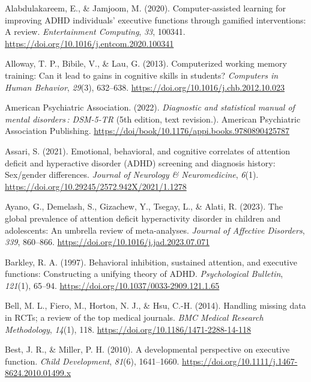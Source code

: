 \documentclass[
  letterpaper,
]{ut-thesis}
\newlength{\cslhangindent}
\newenvironment{CSLReferences}[2] %
 {\begin{list}{}{%
  \setlength{\itemindent}{0pt}
  \setlength{\leftmargin}{0pt}
  \setlength{\parsep}{0pt}
  \ifodd #1
   \setlength{\leftmargin}{\cslhangindent}
   \setlength{\itemindent}{-1\cslhangindent}
  \fi
  \setlength{\itemsep}{#2\baselineskip}}}
 {\end{list}}
\begin{document}
\label{refs}
\begin{CSLReferences}{1}{0}
Alabdulakareem, E., \& Jamjoom, M. (2020). Computer-assisted learning
for improving {ADHD} individuals' executive functions through gamified
interventions: {A} review. \emph{Entertainment Computing}, \emph{33},
100341. \url{https://doi.org/10.1016/j.entcom.2020.100341}

Alloway, T. P., Bibile, V., \& Lau, G. (2013). Computerized working
memory training: {Can} it lead to gains in cognitive skills in students?
\emph{Computers in Human Behavior}, \emph{29}(3), 632--638.
\url{https://doi.org/10.1016/j.chb.2012.10.023}

American Psychiatric Association. (2022). \emph{Diagnostic and
statistical manual of mental disorders : {DSM-5-TR}} (5th edition, text
revision.). American Psychiatric Association Publishing.
\url{https://doi/book/10.1176/appi.books.9780890425787}

Assari, S. (2021). Emotional, behavioral, and cognitive correlates of
attention deficit and hyperactive disorder ({ADHD}) screening and
diagnosis history: {Sex}/gender differences. \emph{Journal of Neurology
\& Neuromedicine}, \emph{6}(1).
\url{https://doi.org/10.29245/2572.942X/2021/1.1278}

Ayano, G., Demelash, S., Gizachew, Y., Tsegay, L., \& Alati, R. (2023).
The global prevalence of attention deficit hyperactivity disorder in
children and adolescents: {An} umbrella review of meta-analyses.
\emph{Journal of Affective Disorders}, \emph{339}, 860--866.
\url{https://doi.org/10.1016/j.jad.2023.07.071}

Barkley, R. A. (1997). Behavioral inhibition, sustained attention, and
executive functions: Constructing a unifying theory of {ADHD}.
\emph{Psychological Bulletin}, \emph{121}(1), 65--94.
\url{https://doi.org/10.1037/0033-2909.121.1.65}

Bell, M. L., Fiero, M., Horton, N. J., \& Hsu, C.-H. (2014). Handling
missing data in {RCTs}; a review of the top medical journals. \emph{BMC
Medical Research Methodology}, \emph{14}(1), 118.
\url{https://doi.org/10.1186/1471-2288-14-118}

Best, J. R., \& Miller, P. H. (2010). A developmental perspective on
executive function. \emph{Child Development}, \emph{81}(6), 1641--1660.
\url{https://doi.org/10.1111/j.1467-8624.2010.01499.x}


\end{CSLReferences}
\end{document}
